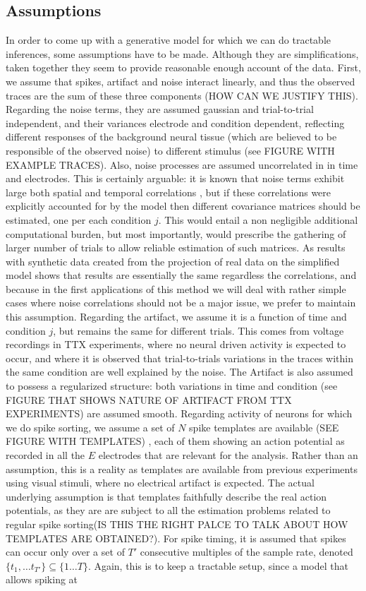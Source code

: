 \documentclass[12pt,letterpaper,fleqn]{article}
\begin{document}
\subsection{Assumptions}
In order to come up with a generative model for which we can do tractable inferences, some assumptions have to be made. Although they are simplifications, taken together they seem to provide reasonable enough account of the data. First, we assume that spikes, artifact and noise interact linearly, and thus the observed traces are the sum of these three components (HOW CAN WE JUSTIFY THIS). Regarding the noise terms, they are assumed gaussian and trial-to-trial independent, and their variances electrode and condition dependent, reflecting different responses of the background neural tissue (which are believed to be responsible of the observed noise) to different stimulus (see FIGURE WITH EXAMPLE TRACES). Also, noise processes are assumed uncorrelated in  in time and electrodes. This is certainly arguable: it is known that noise terms exhibit large both spatial and temporal correlations \cite{PillowShlens}, but if these correlations were explicitly accounted for by the model then different covariance matrices should be estimated, one per each condition $j$. This would entail a non negligible additional computational burden, but most importantly, would prescribe the gathering of larger number of trials to allow reliable estimation of such matrices. As results with synthetic data created from the projection of real data on the simplified model shows that results are essentially the same regardless the correlations, and because in the first applications of this method we will deal with rather simple cases where noise correlations should not be a major issue, we prefer to maintain this assumption. Regarding the artifact, we assume it is a function of time and condition $j$, but remains the same for different trials. This comes from voltage recordings in TTX experiments, where no neural driven activity is expected to occur, and where it is observed that trial-to-trials variations in the traces within the same condition are well explained by the noise. The Artifact is also assumed to possess a regularized structure: both variations in time and condition (see FIGURE THAT SHOWS NATURE OF ARTIFACT FROM TTX EXPERIMENTS) are assumed smooth. Regarding activity of neurons for which we do spike sorting, we assume a set of $N$ spike templates are available (SEE FIGURE WITH TEMPLATES) , each of them showing an action potential as recorded in all the $E$ electrodes that are relevant for the analysis. Rather than an assumption, this is a reality as templates are available from previous experiments using visual stimuli, where no electrical artifact is expected. The actual underlying assumption is that templates faithfully describe the real action potentials, as they are are subject to all the estimation problems related to regular spike sorting(IS THIS THE RIGHT PALCE TO TALK ABOUT HOW TEMPLATES ARE OBTAINED?). For spike timing, it is assumed that spikes can occur only over a set of $T'$ consecutive multiples of the sample rate, denoted $\{t_1,\ldots t_{T'}\}\subseteq \{1\ldots T\}$. Again, this is to keep a tractable setup, since a model that allows spiking at 
\end{document}
